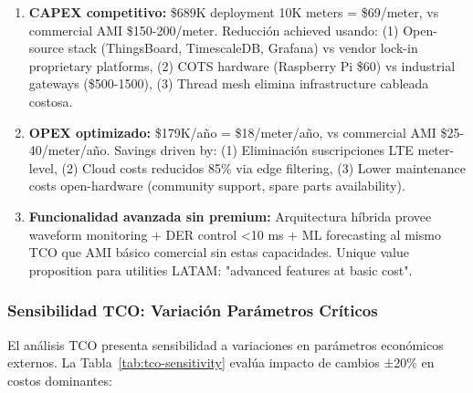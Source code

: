 \begin{enumerate}
\item \textbf{CAPEX competitivo:} \$689K deployment 10K meters = \$69/meter, vs commercial AMI \$150-200/meter. Reducción achieved usando: (1) Open-source stack (ThingsBoard, TimescaleDB, Grafana) vs vendor lock-in proprietary platforms, (2) COTS hardware (Raspberry Pi \$60) vs industrial gateways (\$500-1500), (3) Thread mesh elimina infrastructure cableada costosa.

\item \textbf{OPEX optimizado:} \$179K/año = \$18/meter/año, vs commercial AMI \$25-40/meter/año. Savings driven by: (1) Eliminación suscripciones LTE meter-level, (2) Cloud costs reducidos 85\% via edge filtering, (3) Lower maintenance costs open-hardware (community support, spare parts availability).

\item \textbf{Funcionalidad avanzada sin premium:} Arquitectura híbrida provee waveform monitoring + DER control <10 ms + ML forecasting al mismo TCO que AMI básico comercial sin estas capacidades. Unique value proposition para utilities LATAM: "advanced features at basic cost".
\end{enumerate}

\subsubsection{Sensibilidad TCO: Variación Parámetros Críticos}

El análisis TCO presenta sensibilidad a variaciones en parámetros económicos externos. La Tabla~\ref{tab:tco-sensitivity} evalúa impacto de cambios ±20\% en costos dominantes:

